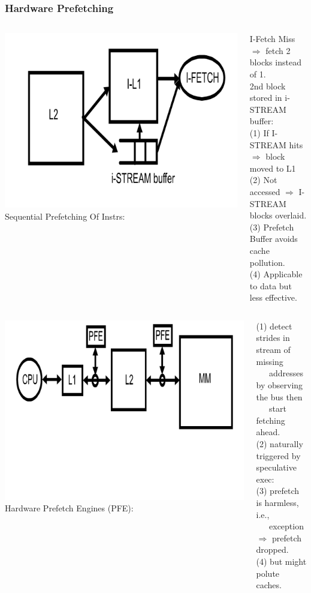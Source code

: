 \documentclass{beamer}
\begin{document}
\begin{frame}[fragile,t]
\frametitle{Hardware Prefetching}

\begin{columns}
\includegraphics[width=27ex]{Figures/FigsMemH/SeqPrefetching}
Sequential Prefetching Of Instrs:\smallskip
\begin{scriptsize}
I-Fetch Miss $\Rightarrow$ fetch 2 blocks instead of 1.\\\smallskip
2nd block stored in i-STREAM buffer:\\
(1) If I-STREAM hits $\Rightarrow$ block moved to L1\\
(2) Not accessed $\Rightarrow$ I-STREAM blocks overlaid.\\
(3) Prefetch Buffer avoids cache pollution.\\
(4) Applicable to data but less effective.
\end  {scriptsize}
\end{columns}

\begin{columns}
\includegraphics[width=33ex]{Figures/FigsMemH/HwdPrefetching}
Hardware Prefetch Engines (PFE):\\\smallskip
\begin{scriptsize}
(1) detect strides in stream of missing\\ 
{\tt~~~}addresses by observing the bus then\\
{\tt~~~}start fetching ahead.\\
(2) naturally triggered by speculative exec:\\ 
(3) prefetch is harmless, i.e.,\\
{\tt~~~}exception $\Rightarrow$ prefetch dropped.\\
(4) but might polute caches.
\end  {scriptsize}
\end{columns}

\end{frame}
\end{document}
